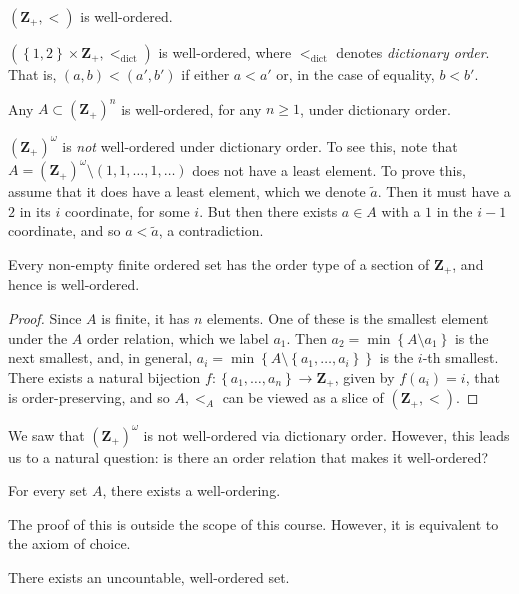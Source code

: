 \begin{example}
$(\mathbf{Z}_{+}, <)$ is well-ordered.
\end{example}
\begin{example}
$(\left\{ 1,2 \right\} \times \mathbf{Z}_{+}, <_{\text{dict}})$ is well-ordered,
where $<_{\text{dict}}$ denotes \emph{dictionary order}. That is,
$(a,b) < (a', b')$ if either $a < a'$ or, in the case of equality,
$b < b'$.
\end{example}
\begin{example}
Any $A \subset \left( \mathbf{Z}_{+} \right)^{n}$ is well-ordered, for any $n \ge 1$, under
dictionary order.
\end{example}
\begin{remark}
$(\mathbf{Z}_{+})^{\omega}$ is \emph{not} well-ordered under dictionary order.
To see this, note that $A = (\mathbf{Z}_{+})^{\omega} \setminus (1, 1, \dots, 1,
\dots)$ does not have a least element. To prove this, assume that it does
have a least element, which we denote $\tilde{a}$.
Then it must have a $2$ in its $i$ coordinate, for some $i$.
But then there exists $a \in A$ with a $1$ in the $i-1$ coordinate, and
so $a < \tilde{a}$, a contradiction.
\end{remark}
\begin{theorem}
Every non-empty finite ordered set has the order type of a section of
$\mathbf{Z}_{+}$, and hence is well-ordered.
\end{theorem}
\begin{proof}
Since $A$ is finite, it has $n$ elements. One of these is the smallest element
under the $A$ order relation, which we label $a_{1}$. Then $a_{2} = \min\left\{
A \setminus a_{1} \right\}$ is the next smallest, and, in general, $a_{i} = \min
\left\{ A \setminus \left\{ a_{1}, \dots, a_{i} \right\} \right\}$ is the $i$-th
smallest. There exists a natural bijection $f: \left\{ a_{1}, \dots, a_{n}
\right\} \to \mathbf{Z}_{+}$, given by $f(a_{i}) = i$, that is order-preserving,
and so $A, <_{A}$ can be viewed as a slice of $(\mathbf{Z}_{+}, <)$.
\end{proof}
We saw that $(\mathbf{Z}_{+})^{\omega}$ is not well-ordered via dictionary
order.  However, this leads us to a natural question: is there an order
relation that makes it well-ordered?

\begin{theorem}[Zermelo]
For every set $A$, there exists a well-ordering.
\end{theorem}
The proof of this is outside the scope of this course. However, it is equivalent
to the axiom of choice.
\begin{corollary}
There exists an uncountable, well-ordered set.
\end{corollary}
